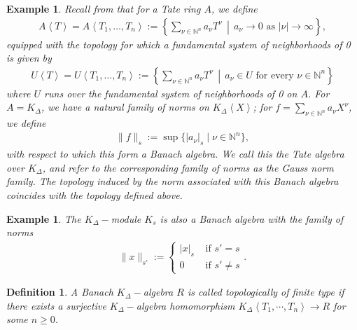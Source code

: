 \documentclass[12pts,a4paper]{amsart}
\newtheorem{definition}[proposition]{Definition}
\newtheorem{example}[proposition]{Example}
\begin{document}
\begin{example}
  Recall from \cite{Hubet} that for a Tate ring $A$, we define
\begin{align*}
    A\left\langle T \right\rangle = A\left\langle T_1, \dots, T_n \right\rangle := \left\{ \sum\limits_{\nu \in \mathbb{N}^n} a_\nu T^\nu \,\middle|\, a_\nu \to 0 \text{ as } |\nu| \to \infty \right\},
\end{align*}
equipped with the topology for which a fundamental system of neighborhoods of 0 is given by
\begin{align*}
    U\left\langle T \right\rangle = U\left\langle T_1, \dots, T_n \right\rangle := \left\{ \sum\limits_{\nu \in \mathbb{N}^n} a_\nu T^\nu \,\middle|\, a_\nu \in U \text{ for every } \nu \in \mathbb{N}^n \right\}
\end{align*}
where $U$ runs over the fundamental system of neighborhoods of 0 on $A$.
For $A = K_\Delta$, we have a natural family of norms on $K_\Delta\left\langle X \right\rangle$; for $f = \sum\limits_{\nu \in \mathbb{N}^n} a_\nu X^\nu$, we define
\begin{align*}
    \|f\|_s := \sup\{ |a_\nu|_s \mid \nu \in \mathbb{N}^n \},
\end{align*}
with respect to which this form a Banach algebra. We call this the \emph{Tate algebra over $K_\Delta$}, and refer to the corresponding family of norms as the \emph{Gauss norm family}. The topology induced by the norm associated with this Banach algebra coincides with the topology defined above.
\end{example}

\begin{example}
    The $K_\Delta-$module $K_s$ is also a Banach algebra with the family of norms
    \begin{align*}
        \|x\|_{s'}:=
        \begin{cases}
            |x|_s & \text{ if } s'=s\\
            0     & \text{ if } s'\neq s
        \end{cases}.
    \end{align*}
\end{example}

\begin{definition}
    A Banach $K_\Delta-$algebra $R$ is called \emph{topologically of finite type} if there exists a surjective $K_\Delta-$algebra homomorphism $K_\Delta\left<T_1,\cdots,T_n\right>\to R$ for some $n\geq 0$.
\end{definition}
\end{document}
